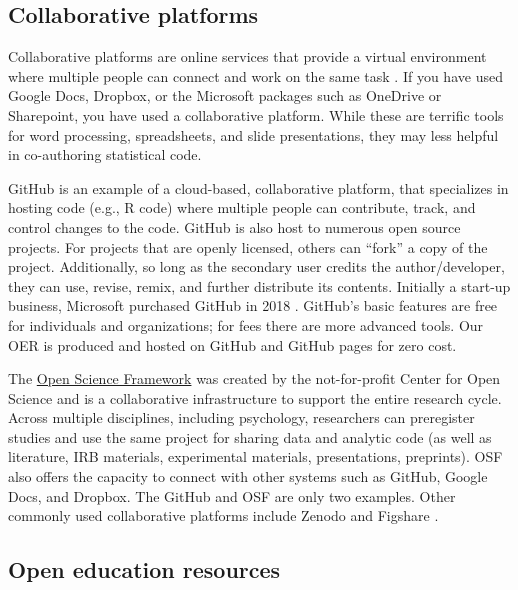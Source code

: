 \documentclass[
  11pt,
]{book}
\begin{document}
\hypertarget{collaborative-platforms}{%
\subsection{Collaborative platforms}\label{collaborative-platforms}}

Collaborative platforms are online services that provide a virtual environment where multiple people can connect and work on the same task \citep{bezjak_open_2018}. If you have used Google Docs, Dropbox, or the Microsoft packages such as OneDrive or Sharepoint, you have used a collaborative platform. While these are terrific tools for word processing, spreadsheets, and slide presentations, they may less helpful in co-authoring statistical code.

GitHub \citep{noauthor_github_2022} is an example of a cloud-based, collaborative platform, that specializes in hosting code (e.g., R code) where multiple people can contribute, track, and control changes to the code. GitHub is also host to numerous open source projects. For projects that are openly licensed, others can ``fork'' a copy of the project. Additionally, so long as the secondary user credits the author/developer, they can use, revise, remix, and further distribute its contents. Initially a start-up business, Microsoft purchased GitHub in 2018 \href{“GitHub,”\%202022b}{\citet{noauthor_github_2022-1}}. GitHub's basic features are free for individuals and organizations; for fees there are more advanced tools. Our OER is produced and hosted on GitHub and GitHub pages for zero cost.

The \href{OSF;\%20https://osf.io/}{Open Science Framework} \citep{osf_open_2022} was created by the not-for-profit Center for Open Science and is a collaborative infrastructure to support the entire research cycle. Across multiple disciplines, including psychology, researchers can preregister studies and use the same project for sharing data and analytic code (as well as literature, IRB materials, experimental materials, presentations, preprints). OSF also offers the capacity to connect with other systems such as GitHub, Google Docs, and Dropbox. The GitHub and OSF are only two examples. Other commonly used collaborative platforms include Zenodo and Figshare \citep{martone_data_2018}.

\hypertarget{open-education-resources}{%
\subsection{Open education resources}\label{open-education-resources}}
\end{document}
